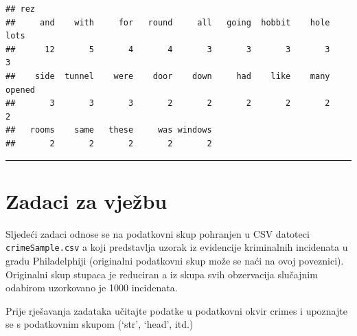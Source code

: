 \documentclass[]{book}
\newenvironment{Shaded}{\begin{snugshade}}{\end{snugshade}}
\newcommand{\KeywordTok}[1]{\textcolor[rgb]{0.13,0.29,0.53}{\textbf{#1}}}
\newcommand{\DataTypeTok}[1]{\textcolor[rgb]{0.13,0.29,0.53}{#1}}
\newcommand{\DecValTok}[1]{\textcolor[rgb]{0.00,0.00,0.81}{#1}}
\newcommand{\StringTok}[1]{\textcolor[rgb]{0.31,0.60,0.02}{#1}}
\newcommand{\OperatorTok}[1]{\textcolor[rgb]{0.81,0.36,0.00}{\textbf{#1}}}
\newcommand{\NormalTok}[1]{#1}
\theoremstyle{definition}
\theoremstyle{definition}
\theoremstyle{definition}
\theoremstyle{remark}
\begin{document}
\begin{Shaded}
\end{Shaded}

\begin{verbatim}
## rez
##     and    with     for   round     all   going  hobbit    hole    lots 
##      12       5       4       4       3       3       3       3       3 
##    side  tunnel    were    door    down     had    like    many  opened 
##       3       3       3       2       2       2       2       2       2 
##   rooms    same   these     was windows 
##       2       2       2       2       2
\end{verbatim}

\begin{center}\rule{0.5\linewidth}{\linethickness}\end{center}

\section*{Zadaci za vježbu}\label{zadaci-za-vjezbu-8}

Sljedeći zadaci odnose se na podatkovni skup pohranjen u CSV datoteci
\texttt{crimeSample.csv} a koji predstavlja uzorak iz evidencije
kriminalnih incidenata u gradu Philadelphiji (originalni podatkovni skup
može se naći na ovoj poveznici). Originalni skup stupaca je reduciran a
iz skupa svih obzervacija slučajnim odabirom uzorkovano je 1000
incidenata.

Prije rješavanja zadataka učitajte podatke u podatkovni okvir crimes i
upoznajte se s podatkovnim skupom (`str', `head', itd.)
\end{document}
